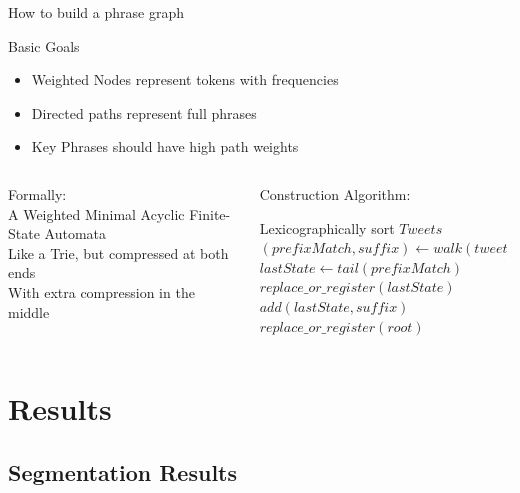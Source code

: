 \documentclass[compress]{beamer}
\begin{document}
\begin{frame}{How to build a phrase graph}
\begin{block}{Basic Goals}
\begin{itemize}
\item Weighted Nodes represent tokens with frequencies
\item Directed paths represent full phrases
\item Key Phrases should have high path weights
\end{itemize}
\end{block}

\pause

\begin{columns}[t]
\begin{column}[1]{5cm}
Formally: \\
A Weighted Minimal Acyclic Finite-State Automata \\
Like a Trie, but compressed at both ends \\
With extra compression in the middle \\
\pause
\end{column}
\begin{column}[2]{5cm}
Construction Algorithm\cite{daciuk99incremental}:
{\tiny
\begin{algorithm}[H]
Lexicographically sort $Tweets$ \\
 {
    $(prefixMatch, suffix) \leftarrow walk(tweet)$ \\
    $lastState \leftarrow tail(prefixMatch)$ \\
     {
        $replace\_or\_register(lastState)$
    }
    $add(lastState, suffix)$ \\
}
$replace\_or\_register(root)$
\end{algorithm}
}

\end{column}
\end{columns}
\end{frame}

\section{Results}
\subsection{Segmentation Results}
\end{document}
